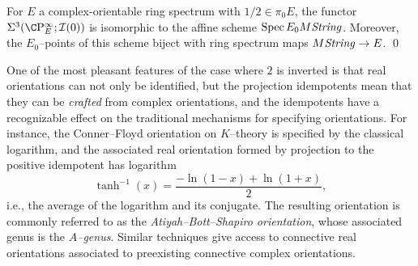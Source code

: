 \begin{corollary}\label{OddPrimaryMStringTriumvirate}
For $E$ a complex-orientable ring spectrum with $1/2 \in \pi_0 E$, the functor $\Sigma^3(\CP^\infty_E; \sheaf I(0))$ is isomorphic to the affine scheme $\operatorname{Spec} E_0 M\mathit{String}$.  Moreover, the $E_0$--points of this scheme biject with ring spectrum maps $M\mathit{String} \to E$. \qed
\end{corollary}

\begin{remark}
One of the most pleasant features of the case where $2$ is inverted is that real orientations can not only be identified, but the projection idempotents mean that they can be \emph{crafted} from complex orientations, and the idempotents have a recognizable effect on the traditional mechanisms for specifying orientations.  For instance, the Conner--Floyd orientation on $K$--theory is specified by the classical logarithm, and the associated real orientation formed by projection to the positive idempotent has logarithm \[\operatorname{tanh}^{-1}(x) = \frac{-\ln(1 - x) + \ln(1 + x)}{2},\] i.e., the average of the logarithm and its conjugate.  The resulting orientation is commonly referred to as the \textit{Atiyah--Bott--Shapiro orientation}, whose associated genus is the \textit{$\widehat A$--genus}.  Similar techniques give access to connective real orientations associated to preexisting connective complex orientations.
\end{remark}

